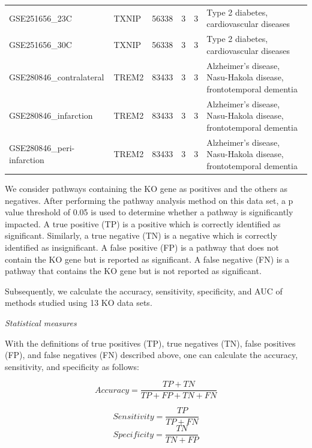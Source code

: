 \documentclass[Minh_PhD_thesis.tex]{subfiles}
\begin{document}
\begin{landscape}
\begin{longtable}{@{}llcccl@{}}
GSE251656\_23C		    	&TXNIP		&56338	&3	&3	&Type 2 diabetes, cardiovascular diseases \\	
GSE251656\_30C			&TXNIP		&56338	&3	&3	&Type 2 diabetes, cardiovascular diseases\\	
GSE280846\_contralateral	&TREM2		&83433	&3	&3	&Alzheimer’s disease,  Nasu-Hakola disease, frontotemporal dementia\\	
GSE280846\_infarction		&TREM2		&83433	&3	&3	&Alzheimer’s disease,  Nasu-Hakola disease, frontotemporal dementia \\	
GSE280846\_peri-infarction	&TREM2		&83433	&3	&3	&Alzheimer’s disease,  Nasu-Hakola disease, frontotemporal dementia\\	
\hline
 \end{longtable}
\end{landscape}

We consider pathways containing the KO gene as positives and the others as negatives. After performing the pathway analysis method on this data set, a p value threshold of 0.05 is used to determine whether a pathway is significantly impacted. A true positive (TP) is a positive which is correctly identified as significant. 
Similarly, a true negative (TN) is a negative which is correctly identified as insignificant.
A false positive (FP) is a pathway that does not contain the KO gene but is reported as significant. A false negative (FN) is a pathway that contains the KO gene but is not reported as significant.

Subsequently, we calculate the accuracy, sensitivity, specificity, and AUC of methods studied using 13 KO data sets.

\textit{Statistical measures} 

With the definitions of true positives (TP), true negatives (TN), false positives (FP), and false negatives (FN) described above, one can calculate the accuracy, sensitivity, and specificity as follows:

\begin{equation}
Accuracy = \frac{TP + TN}{TP + FP + TN + FN}
\end{equation}

\begin{equation}
Sensitivity = \frac{TP}{TP + FN}
\end{equation}
\begin{equation}
Specificity = \frac{TN}{TN + FP}
\end{equation}
\end{document}
